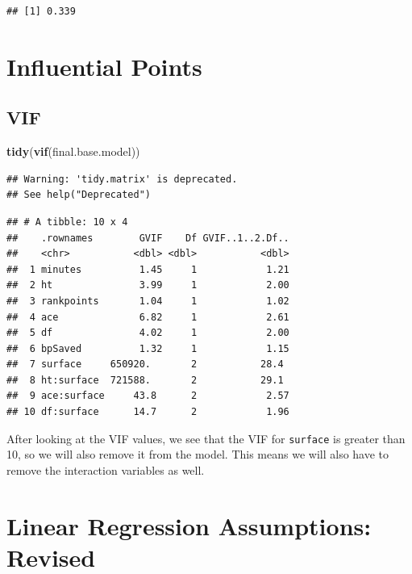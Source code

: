 \documentclass[]{article}
\newenvironment{Shaded}{\begin{snugshade}}{\end{snugshade}}
\newcommand{\KeywordTok}[1]{\textcolor[rgb]{0.13,0.29,0.53}{\textbf{#1}}}
\newcommand{\NormalTok}[1]{#1}
\begin{document}
\begin{verbatim}
## [1] 0.339
\end{verbatim}

\hypertarget{influential-points}{%
\section{Influential Points}\label{influential-points}}

\hypertarget{vif}{%
\subsection{VIF}\label{vif}}

\begin{Shaded}
\begin{Highlighting}[]
\KeywordTok{tidy}\NormalTok{(}\KeywordTok{vif}\NormalTok{(final.base.model))}
\end{Highlighting}
\end{Shaded}

\begin{verbatim}
## Warning: 'tidy.matrix' is deprecated.
## See help("Deprecated")
\end{verbatim}

\begin{verbatim}
## # A tibble: 10 x 4
##    .rownames        GVIF    Df GVIF..1..2.Df..
##    <chr>           <dbl> <dbl>           <dbl>
##  1 minutes          1.45     1            1.21
##  2 ht               3.99     1            2.00
##  3 rankpoints       1.04     1            1.02
##  4 ace              6.82     1            2.61
##  5 df               4.02     1            2.00
##  6 bpSaved          1.32     1            1.15
##  7 surface     650920.       2           28.4 
##  8 ht:surface  721588.       2           29.1 
##  9 ace:surface     43.8      2            2.57
## 10 df:surface      14.7      2            1.96
\end{verbatim}

After looking at the VIF values, we see that the VIF for
\texttt{surface} is greater than 10, so we will also remove it from the
model. This means we will also have to remove the interaction variables
as well.

\hypertarget{linear-regression-assumptions-revised}{%
\section{Linear Regression Assumptions:
Revised}\label{linear-regression-assumptions-revised}}
\end{document}
